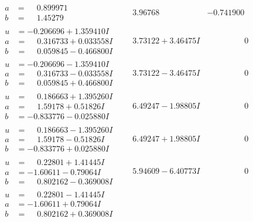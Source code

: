 \documentclass[1p]{elsarticle_modified}
\theoremstyle{definition}
\begin{document}
$$\begin{array}{c|c|c}
\begin{aligned}
a &= \phantom{-}0.899971\phantom{ +0.000000I} \\
b &= \phantom{-}1.45279\phantom{ +0.000000I}\end{aligned}
 & \phantom{-}3.96768\phantom{ +0.000000I} & -0.741900\phantom{ +0.000000I} \\ \hline\begin{aligned}
u &= -0.206696 + 1.359410 I \\
a &= \phantom{-}0.316733 + 0.033558 I \\
b &= \phantom{-}0.059845 - 0.466800 I\end{aligned}
 & \phantom{-}3.73122 + 3.46475 I & \phantom{-0.000000 } 0 \\ \hline\begin{aligned}
u &= -0.206696 - 1.359410 I \\
a &= \phantom{-}0.316733 - 0.033558 I \\
b &= \phantom{-}0.059845 + 0.466800 I\end{aligned}
 & \phantom{-}3.73122 - 3.46475 I & \phantom{-0.000000 } 0 \\ \hline\begin{aligned}
u &= \phantom{-}0.186663 + 1.395260 I \\
a &= \phantom{-}1.59178 + 0.51826 I \\
b &= -0.833776 - 0.025880 I\end{aligned}
 & \phantom{-}6.49247 - 1.98805 I & \phantom{-0.000000 } 0 \\ \hline\begin{aligned}
u &= \phantom{-}0.186663 - 1.395260 I \\
a &= \phantom{-}1.59178 - 0.51826 I \\
b &= -0.833776 + 0.025880 I\end{aligned}
 & \phantom{-}6.49247 + 1.98805 I & \phantom{-0.000000 } 0 \\ \hline\begin{aligned}
u &= \phantom{-}0.22801 + 1.41445 I \\
a &= -1.60611 - 0.79064 I \\
b &= \phantom{-}0.802162 - 0.369008 I\end{aligned}
 & \phantom{-}5.94609 - 6.40773 I & \phantom{-0.000000 } 0 \\ \hline\begin{aligned}
u &= \phantom{-}0.22801 - 1.41445 I \\
a &= -1.60611 + 0.79064 I \\
b &= \phantom{-}0.802162 + 0.369008 I\end{aligned}

\end{array}$$
\end{document}
